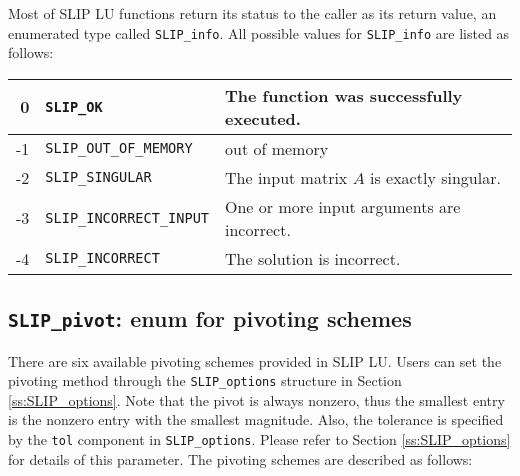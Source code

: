\documentclass[11pt]{article}
\theoremstyle{definition}
\begin{document}
Most of SLIP LU functions return its status to the caller as its return value,
an enumerated type called \verb|SLIP_info|. All possible values for
\verb|SLIP_info| are listed as follows:

\begin{center}
\begin{tabular}{rll}
\hline
    0& \verb|SLIP_OK|& The function was successfully executed.\\
\hline
    -1& \verb|SLIP_OUT_OF_MEMORY|& out of memory\\
\hline
    -2& \verb|SLIP_SINGULAR|& The input matrix $A$ is exactly singular.\\
\hline
    -3& \verb|SLIP_INCORRECT_INPUT|& One or more input arguments are incorrect.\\
\hline
    -4& \verb|SLIP_INCORRECT|& The solution is incorrect.\\
\hline
\end{tabular}
\end{center}

\cprotect\subsection{\verb|SLIP_pivot|: enum for pivoting schemes}
\label{ss:SLIP_pivot}

There are six available pivoting schemes provided in SLIP LU.  Users can set
the pivoting method through the \verb|SLIP_options| structure in Section
\ref{ss:SLIP_options}. Note that the pivot is always nonzero, thus the smallest
entry is the nonzero entry with the smallest magnitude.  Also, the tolerance is
specified by the \verb|tol| component in \verb|SLIP_options|.  Please refer to
Section \ref{ss:SLIP_options} for details of this parameter. The pivoting
schemes are described as follows:
\end{document}
